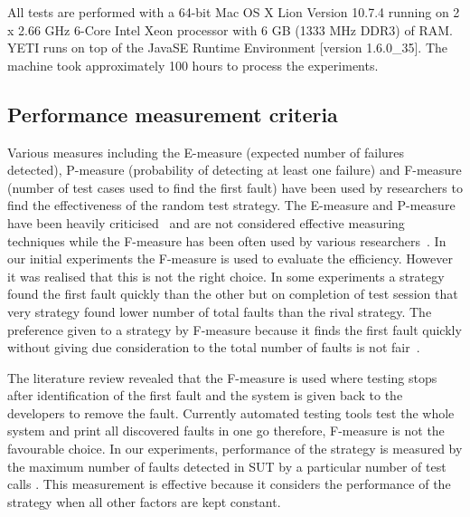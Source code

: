 All tests are performed with a 64-bit Mac OS X Lion Version 10.7.4 running on 2 x 2.66 GHz 6-Core Intel Xeon processor with 6 GB (1333 MHz DDR3) of RAM. YETI runs on top of the Java\texttrademark  SE Runtime Environment [version 1.6.0\_35]. The machine took approximately 100 hours to process the experiments.


\subsection{Performance measurement criteria}
Various measures including the E-measure (expected number of failures detected), P-measure (probability of detecting at least one failure) and F-measure (number of test cases used to find the first fault) have been used by researchers to find the effectiveness of the random test strategy. The E-measure and P-measure have been heavily criticised~\cite{Chen2008} and are not considered effective measuring techniques while the F-measure has been often used by various researchers~\cite{Chen1996, Chen2004}. In our initial experiments the F-measure is used to evaluate the efficiency. However it was realised that this is not the right choice. In some experiments a strategy found the first fault quickly than the other but on completion of test session that very strategy found lower number of total faults than the rival strategy. The preference given to a strategy by F-measure because it finds the first fault quickly without giving due consideration to the total number of faults is not fair~\cite{Liu2012}.


  
The literature review revealed that the F-measure is used where testing stops after identification of the first fault and the system is given back to the developers to remove the fault. Currently automated testing tools test the whole system and print all discovered faults in one go therefore, F-measure is not the favourable choice. In our experiments, performance of the strategy is measured by the maximum number of faults detected in SUT by a particular number of test calls \cite{Pacheco2007, Ciupa2007, Ciupa2008b}. This measurement is effective because it considers the performance of the strategy when all other factors are kept constant.

